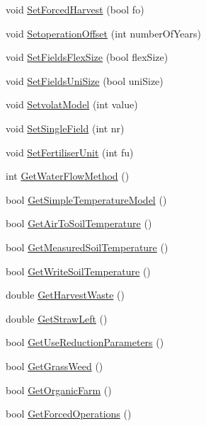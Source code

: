 \begin{DoxyCompactItemize}
\item 
void \hyperlink{classcontrol_parameters_a968c37e5b24dc3db6bc6027399cc0af2}{SetForcedHarvest} (bool fo)
\item 
void \hyperlink{classcontrol_parameters_a020ac9a97ec3af51bb2a921810a7cfcd}{SetoperationOffset} (int numberOfYears)
\item 
void \hyperlink{classcontrol_parameters_adf610c19ca264fe9529a0817e2c3142d}{SetFieldsFlexSize} (bool flexSize)
\item 
void \hyperlink{classcontrol_parameters_aed613973e136c1ff17be0e2e251698da}{SetFieldsUniSize} (bool uniSize)
\item 
void \hyperlink{classcontrol_parameters_a41cbb9fab54ae32c76dbf36104dd14e9}{SetvolatModel} (int value)
\item 
void \hyperlink{classcontrol_parameters_aa3ae5ac8d10b8b1e3ef726d77a8bb7d5}{SetSingleField} (int nr)
\item 
void \hyperlink{classcontrol_parameters_a9a3bdac021c3062f68ff30f0c178a660}{SetFertiliserUnit} (int fu)
\item 
int \hyperlink{classcontrol_parameters_aa23014a0d5a57beef02dc17787ca5ff6}{GetWaterFlowMethod} ()
\item 
bool \hyperlink{classcontrol_parameters_acc775aa5ded70768f3248110f1ff47b7}{GetSimpleTemperatureModel} ()
\item 
bool \hyperlink{classcontrol_parameters_add34033c9c86c35d6f55c9da59db3818}{GetAirToSoilTemperature} ()
\item 
bool \hyperlink{classcontrol_parameters_ae6fc8fcf70764dce9c38d52aaaad6bfe}{GetMeasuredSoilTemperature} ()
\item 
bool \hyperlink{classcontrol_parameters_a5222f361b4bdd1ce711b9b930b7bef56}{GetWriteSoilTemperature} ()
\item 
double \hyperlink{classcontrol_parameters_a3a4380546d0ccc1a1e244dd100afb6a6}{GetHarvestWaste} ()
\item 
double \hyperlink{classcontrol_parameters_af431ae885c2ad1e5326c4b2e0a8bd26e}{GetStrawLeft} ()
\item 
bool \hyperlink{classcontrol_parameters_a3c794ab0f97f25c5b543ae366a9f2ebb}{GetUseReductionParameters} ()
\item 
bool \hyperlink{classcontrol_parameters_a75a0db71558f99e709887174e404771d}{GetGrassWeed} ()
\item 
bool \hyperlink{classcontrol_parameters_af374b7e293c842883e0fd051df18dd90}{GetOrganicFarm} ()
\item 
bool \hyperlink{classcontrol_parameters_a148298acd1a20a91ddf723cbbea6f02f}{GetForcedOperations} ()

\end{DoxyCompactItemize}
